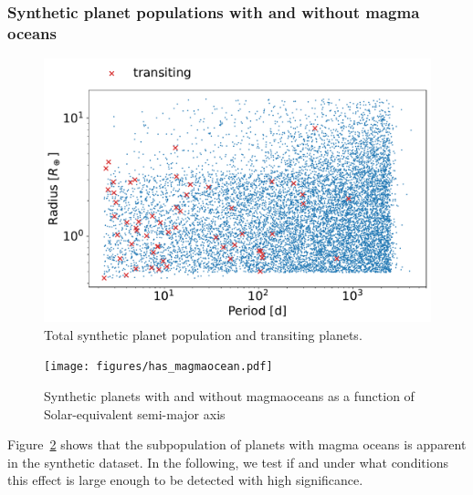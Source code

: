 \documentclass[modern]{aastex631}
\begin{document}
\subsubsection{Synthetic planet populations with and without magma oceans}
\begin{note}

\end{note}


\begin{figure}
    \begin{centering}
        \includegraphics[width=\hsize]{figures/synthetic_population.pdf}
        \caption{Total synthetic planet population and transiting planets.}
        \label{fig:synthetic_population}
    \end{centering}
\end{figure}


\begin{figure}
    \begin{centering}
        \texttt{[image: figures/has\_magmaocean.pdf]}
        \caption{Synthetic planets with and without magmaoceans as a function of Solar-equivalent semi-major axis}
        \label{fig:has_magmaocean}
    \end{centering}
\end{figure}



\begin{note}
Figure~\ref{fig:has_magmaocean} shows that the subpopulation of planets with magma oceans is apparent in the synthetic dataset.
    In the following, we test if and under what conditions this effect is large enough to be detected with high significance.
\end{note}
\end{document}
